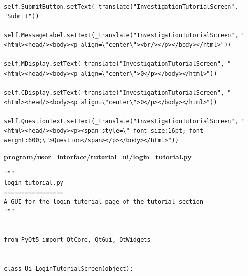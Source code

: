 \documentclass{article}
\begin{document}
\begin{lstlisting}
        self.SubmitButton.setText(_translate("InvestigationTutorialScreen", "Submit"))
        self.MessageLabel.setText(_translate("InvestigationTutorialScreen", "<html><head/><body><p align=\"center\"><br/></p></body></html>"))
        self.MDisplay.setText(_translate("InvestigationTutorialScreen", "<html><head/><body><p align=\"center\">0</p></body></html>"))
        self.CDisplay.setText(_translate("InvestigationTutorialScreen", "<html><head/><body><p align=\"center\">0</p></body></html>"))
        self.QuestionText.setText(_translate("InvestigationTutorialScreen", "<html><head/><body><p><span style=\" font-size:16pt; font-weight:600;\">Question</span></p></body></html>"))
\end{lstlisting}

\textbf{program/user\_interface/tutorial\_ui/login\_tutorial.py}
\begin{lstlisting}
"""
login_tutorial.py
=================
A GUI for the login tutorial page of the tutorial section
"""


from PyQt5 import QtCore, QtGui, QtWidgets


class Ui_LoginTutorialScreen(object):


\end{lstlisting}
\end{document}
